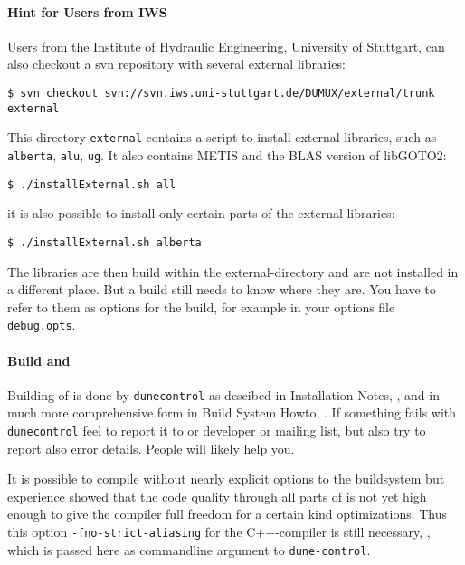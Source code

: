 \paragraph{Hint for Users from IWS} Users from the Institute of Hydraulic Engineering, University of Stuttgart,
can also checkout a svn repository with several external libraries: \\

\begin{lstlisting}[style=Bash]
$ svn checkout svn://svn.iws.uni-stuttgart.de/DUMUX/external/trunk external
\end{lstlisting}

This directory \texttt{external} contains a script to install external libraries, such as 
\texttt{alberta}, \texttt{alu}, \texttt{ug}. It also contains METIS and the BLAS version of libGOTO2: 
\begin{lstlisting}[style=Bash]
$ ./installExternal.sh all
\end{lstlisting}
it is also possible to install only certain parts of the external libraries:
\begin{lstlisting}[style=Bash]
$ ./installExternal.sh alberta
\end{lstlisting}

The libraries are then build within the external-directory and are not installed in a different place. 
But a \Dune build still needs to know where they are. You have to refer to them as options for the \Dune build, for example in your options file \texttt{debug.opts}.


\paragraph{Build \Dune and \Dumux}
\label{buildIt}
Building of \Dune is done by \texttt{dunecontrol} as descibed in \Dune Installation Notes, \cite{DUNE-INST}, and in much more comprehensive form in \Dune Build System Howto, \cite{DUNE-BS}.
If something fails with \texttt{dunecontrol} feel to report it to \Dune or \Dumux developer or mailing list, but also try to report also error details. People will likely help you.


It is possible to compile \Dumux without nearly explicit options to the buildsystem but
experience showed that the code quality through all parts of \Dune is not yet high enough to give the compiler full freedom for a certain kind optimizations. Thus this option \texttt{-fno-strict-aliasing} for the C++-compiler is still necessary, \cite{WIKIPED-ALIASING}, which is passed here as commandline argument to \texttt{dune-control}.


